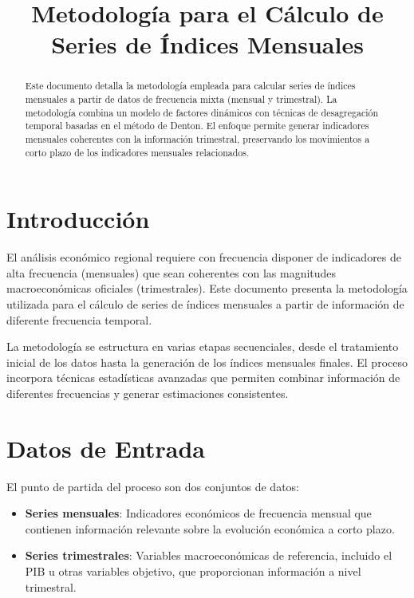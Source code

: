 \documentclass[12pt,a4paper]{article}
\title{Metodología para el Cálculo de Series de Índices Mensuales}
\author{}
\date{}
\begin{document}
\maketitle

\begin{abstract}
Este documento detalla la metodología empleada para calcular series de índices mensuales a partir de datos de frecuencia mixta (mensual y trimestral). La metodología combina un modelo de factores dinámicos con técnicas de desagregación temporal basadas en el método de Denton. El enfoque permite generar indicadores mensuales coherentes con la información trimestral, preservando los movimientos a corto plazo de los indicadores mensuales relacionados.
\end{abstract}

\section{Introducción}

El análisis económico regional requiere con frecuencia disponer de indicadores de alta frecuencia (mensuales) que sean coherentes con las magnitudes macroeconómicas oficiales (trimestrales). Este documento presenta la metodología utilizada para el cálculo de series de índices mensuales a partir de información de diferente frecuencia temporal.

La metodología se estructura en varias etapas secuenciales, desde el tratamiento inicial de los datos hasta la generación de los índices mensuales finales. El proceso incorpora técnicas estadísticas avanzadas que permiten combinar información de diferentes frecuencias y generar estimaciones consistentes.

\section{Datos de Entrada}

El punto de partida del proceso son dos conjuntos de datos:

\begin{itemize}
    \item \textbf{Series mensuales}: Indicadores económicos de frecuencia mensual que contienen información relevante sobre la evolución económica a corto plazo.
    \item \textbf{Series trimestrales}: Variables macroeconómicas de referencia, incluido el PIB u otras variables objetivo, que proporcionan información a nivel trimestral.
\end{itemize}
\end{document}
